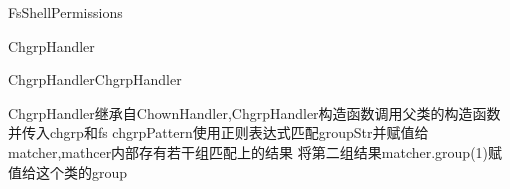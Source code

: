 \begin{XeClass}{FsShellPermissions}
\begin{XeInnerClass}{ChgrpHandler}
        \begin{XeMethod}{}{ChgrpHandler}{ChgrpHandler}
             
 ChgrpHandler继承自ChownHandler,ChgrpHandler构造函数调用父类的构造函数并传入chgrp和fs
 chgrpPattern使用正则表达式匹配groupStr并赋值给matcher,mathcer内部存有若干组匹配上的结果
 将第二组结果matcher.group(1)赋值给这个类的group

        \end{XeMethod}

    \end{XeInnerClass}
\end{XeClass}
